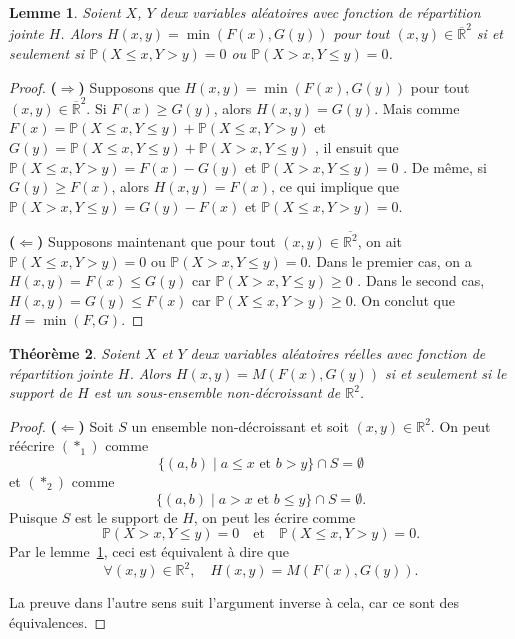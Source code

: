 \documentclass[a4paper,11pt]{amsbook}
\numberwithin{equation}{chapter}
\newtheorem{theoreme}			     {Théorème}	[chapter]
\newtheorem{lemme}	    [theoreme]	 {Lemme}
\theoremstyle{definition}
\begin{document}
\begin{lemme}\label{lem:ND_set2}
Soient $X$, $Y$ deux variables aléatoires avec fonction de répartition jointe $H$. Alors $H(x,y) = \min(F(x), G(y))$ pour tout $(x,y) \in \overline{\mathbb{R}}^2$ si et seulement si $\mathbb{P}(X \leq x, Y > y) = 0$ ou $\mathbb{P}(X > x, Y \leq y) = 0$.
\end{lemme}

\begin{proof}
\textbf{(\(\Rightarrow\))} Supposons que $H(x,y) = \min(F(x), G(y))$ pour tout $(x,y) \in \overline{\mathbb{R}}^2$. Si $F(x) \geq G(y)$, alors $H(x,y) = G(y)$. Mais comme $F(x) = \mathbb{P}(X \leq x, Y \leq y)+ \mathbb{P}(X \leq x, Y > y)$ et $G(y) = \mathbb{P}(X \leq x, Y \leq y)+ \mathbb{P}(X > x, Y \leq y)$ , il ensuit que $\mathbb{P}(X \leq x, Y > y) = F(x) - G(y)$ et $\mathbb{P}(X > x, Y \leq y) = 0$ . De même, si $G(y) \geq F(x)$, alors $H(x,y) = F(x)$, ce qui implique que $\mathbb{P}(X > x, Y \leq y) = G(y) - F(x)$ et $\mathbb{P}(X \leq x, Y > y) = 0$.

\textbf{(\(\Leftarrow\))} Supposons maintenant que pour tout $(x,y) \in \overline{\mathbb{R}^2}$, on ait $\mathbb{P}(X \leq x, Y > y) = 0$ ou $\mathbb{P}(X > x, Y \leq y) = 0$. Dans le premier cas, on a $H(x,y)=F(x) \leq G(y)$ car $\mathbb{P}(X > x, Y \leq y)\geq 0$ . Dans le second cas, $H(x,y)=G(y) \leq F(x)$ car $\mathbb{P}(X \leq x, Y > y)\geq 0$. On conclut que $H = \min(F, G)$.
\end{proof}

\begin{theoreme}\label{thm:ND_Set}
Soient $X$ et $Y$ deux variables aléatoires réelles avec fonction de répartition jointe $H$. Alors $H(x,y) = M(F(x), G(y))$ si et seulement si le support de $H$ est un sous-ensemble non-décroissant de $\mathbb{R}^2$.
\end{theoreme}

\begin{proof}
\textbf{(\(\Leftarrow\))}  
Soit $S$ un ensemble non-décroissant et soit $(x,y) \in \mathbb{R}^2$.  
On peut réécrire $(\ast_1)$ comme  
\[
\{(a,b) \mid a \leq x \text{ et } b > y\} \cap S = \emptyset
\]  
et $(\ast_2)$ comme  
\[
\{(a,b) \mid a > x \text{ et } b \leq y\} \cap S = \emptyset.
\]  
Puisque $S$ est le support de $H$, on peut les écrire comme  
\[
\mathbb{P}(X > x, Y \leq y) = 0 \quad \text{et} \quad \mathbb{P}(X \leq x, Y > y) = 0.
\]  
Par le lemme~\ref{lem:ND_set2}, ceci est équivalent à dire que  
\[
\forall (x,y) \in \mathbb{R}^2, \quad H(x,y) = M(F(x), G(y)).
\]  

La preuve dans l'autre sens suit l'argument inverse à cela, car ce sont des équivalences.
\end{proof}
\end{document}
